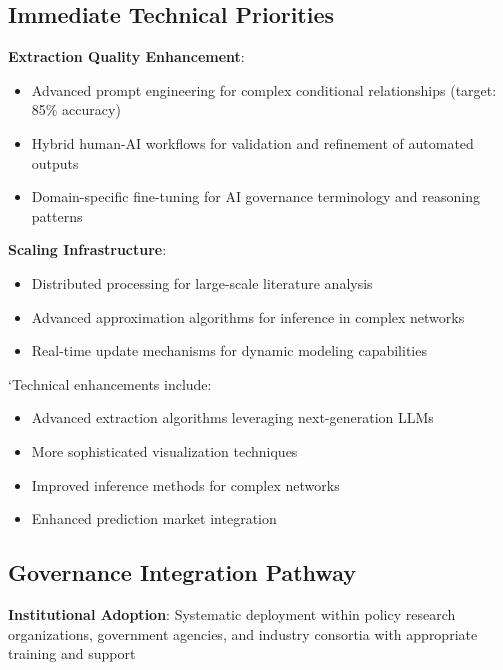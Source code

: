 \documentclass[
  11pt,
  letterpaper,
]{book}
\providecommand{\tightlist}{%
  \setlength{\itemsep}{0pt}\setlength{\parskip}{0pt}}
\begin{document}
\subsection{Immediate Technical
Priorities}\label{sec-technical-priorities2}

\textbf{Extraction Quality Enhancement}:

\begin{itemize}
\tightlist
\item
  Advanced prompt engineering for complex conditional relationships
  (target: 85\% accuracy)
\item
  Hybrid human-AI workflows for validation and refinement of automated
  outputs
\item
  Domain-specific fine-tuning for AI governance terminology and
  reasoning patterns
\end{itemize}

\textbf{Scaling Infrastructure}:

\begin{itemize}
\tightlist
\item
  Distributed processing for large-scale literature analysis
\item
  Advanced approximation algorithms for inference in complex networks
\item
  Real-time update mechanisms for dynamic modeling capabilities
\end{itemize}

`Technical enhancements include:

\begin{itemize}
\tightlist
\item
  Advanced extraction algorithms leveraging next-generation LLMs
\item
  More sophisticated visualization techniques
\item
  Improved inference methods for complex networks
\item
  Enhanced prediction market integration
\end{itemize}

\subsection{Governance Integration
Pathway}\label{sec-governance-pathway}

\textbf{Institutional Adoption}: Systematic deployment within policy
research organizations, government agencies, and industry consortia with
appropriate training and support
\end{document}
